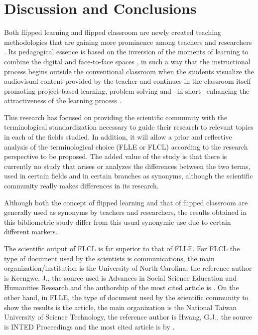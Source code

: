 \documentclass{textolivre-html}
\begin{document}
\section{Discussion and Conclusions}\label{sec-discussion}
Both flipped learning and flipped classroom are newly created teaching methodologies that are gaining more prominence among teachers and researchers \cite{hinojo-lucena_incidence_2018}. Its pedagogical essence is based on the inversion of the moments of learning to combine the digital and face-to-face spaces \cite{lee_development_2017}, in such a way that the instructional process begins outside the conventional classroom \cite{borao_moreno_alisis_2016} when the students visualize the audiovisual content provided by the teacher \cite{el_miedany_flipped_2019,long_use_2017} and continues in the classroom itself promoting project-based learning, problem solving and –in short– enhancing the attractiveness of the learning process \cite{kostaris_investigating_2017}.

This research has focused on providing the scientific community with the terminological standardization necessary to guide their research to relevant topics in each of the fields studied. In addition, it will allow a prior and reflective analysis of the terminological choice (FLLE or FLCL) according to the research perspective to be proposed. The added value of the study is that there is currently no study that arises or analyzes the differences between the two terms, used in certain fields and in certain branches as synonyms, although the scientific community really makes differences in its research.

Although both the concept of flipped learning and that of flipped classroom are generally used as synonyms by teachers and researchers, the results obtained in this bibliometric study differ from this usual synonymic use due to certain different markers. 

The scientific output of FLCL is far superior to that of FLLE. For FLCL the type of document used by the scientists is communications, the main organization/institution is the University of North Carolina, the reference author is Keengwe, J., the source used is Advances in Social Science Education and Humanities Research and the authorship of the most cited article is \textcite{mclaughlin_flipped_2014}. On the other hand, in FLLE, the type of document used by the scientific community to show the results is the article, the main organization is the National Taiwan University of Science Technology, the reference author is Hwang, G.J., the source is INTED Proceedings and the most cited article is by \textcite{chen_is_2014}.
\end{document}
